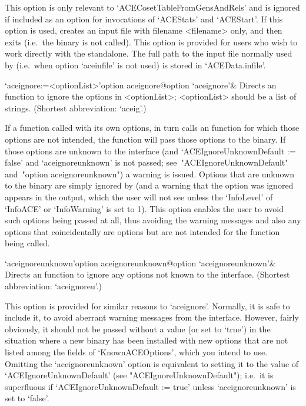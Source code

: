 This option is only relevant to `ACECosetTableFromGensAndRels' and  is
ignored if included as an option for  invocations  of  `ACEStats'  and
`ACEStart'. If this option is used, {\GAP} creates an input file  with
filename <filename> only, and then exits (i.e.~the  {\ACE}  binary  is
not called). This option is  provided  for  users  who  wish  to  work
directly with the {\ACE} standalone. The full path to the  input  file
normally used by {\ACE} (i.e.~when option `aceinfile' is not used)  is
stored in `ACEData.infile'.


\>`aceignore:=<optionList>'{option aceignore}@{option `aceignore'}&
Directs an {\ACE} function to  ignore  the  options  in  <optionList>;
<optionList> should be a list of strings.
(Shortest abbreviation: `aceig'.)

If a function called with its own options, in  turn  calls  an  {\ACE}
function for which those options are not intended, the {\ACE} function
will pass those options to the {\ACE} binary.  If  those  options  are
unknown to  the  {\ACE}  interface  (and  `ACEIgnoreUnknownDefault  :=
false'      and      `aceignoreunknown'      is      not       passed;
see~"ACEIgnoreUnknownDefault" and~"option aceignoreunknown") a warning
is issued. Options that are unknown to the {\ACE}  binary  are  simply
ignored by {\ACE} (and a warning that the option was  ignored  appears
in the  {\ACE}  output,  which  the  user  will  not  see  unless  the
`InfoLevel' of `InfoACE' or `InfoWarning' is set to  1).  This  option
enables the user to avoid such  options  being  passed  at  all,  thus
avoiding the warning messages and also any options that coincidentally
are {\ACE} options but are not intended for the {\ACE} function  being
called.

\>`aceignoreunknown'{option aceignoreunknown}@{option `aceignoreunknown'}&
Directs an {\ACE} function to ignore any  options  not  known  to  the
{\ACE} interface.
(Shortest abbreviation: `aceignoreu'.)

This option is provided for similar reasons to `aceignore'.  Normally,
it is safe to include it, to avoid aberrant warning messages from  the
{\ACE} interface. However, fairly obviously, it should not  be  passed
without a value (or set to `true') in the situation where a new {\ACE}
binary has been installed with new options that are not  listed  among
the fields of `KnownACEOptions', which you intend to use. Omitting the
`aceignoreunknown' option is equivalent to setting it to the value  of
`ACEIgnoreUnknownDefault' (see "ACEIgnoreUnknownDefault"); i.e.~it  is
superfluous    if    `ACEIgnoreUnknownDefault    :=    true'    unless
`aceignoreunknown' is set to `false'.

